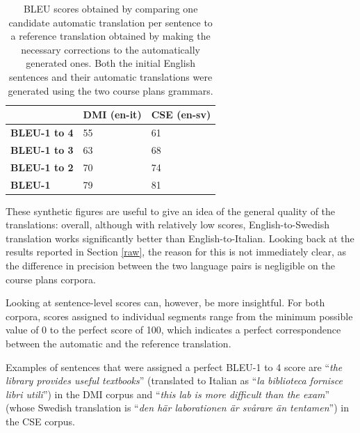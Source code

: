 \documentclass[11pt]{article}
\begin{document}
\begin{table}[h]
  \centering
  \begin{tabular}{l|ll}
  \textbf{}            & \textbf{DMI (en-it)} & \textbf{CSE (en-sv)} \\ \hline
  \textbf{BLEU-1 to 4} & 55         & 61         \\ 
  \textbf{BLEU-1 to 3} & 63         & 68         \\ 
  \textbf{BLEU-1 to 2} & 70         & 74          \\
  \textbf{BLEU-1}      & 79         & 81         \\ 
  \end{tabular}
  \caption[BLEU scores for automatic translations based on the course plans grammars]{BLEU scores obtained by comparing one candidate automatic translation per sentence to a reference translation obtained by making the necessary corrections to the automatically generated ones. Both the initial English sentences and their automatic translations were generated using the two course plans grammars.}
  \label{tableu}
\end{table}

These synthetic figures are useful to give an idea of the general quality of the translations: overall, although with relatively low scores, English-to-Swedish translation works significantly better than English-to-Italian. 
Looking back at the results reported in Section \ref{raw}, the reason for this is not immediately clear, as the difference in precision between the two language pairs is negligible on the course plans corpora.

Looking at sentence-level scores can, however, be more insightful. 
For both corpora, scores assigned to individual segments range from the minimum possible value of 0 to the perfect score of 100, which indicates a perfect correspondence between the automatic and the reference translation.

Examples of sentences that were assigned a perfect BLEU-1 to 4 score are ``\textit{the library provides useful textbooks}'' (translated to Italian as ``\textit{la biblioteca fornisce libri utili}'') in the DMI corpus and ``\textit{this lab is more difficult than the exam}'' (whose Swedish translation is ``\textit{den här laborationen är svårare än tentamen}'') in the CSE corpus. \smallskip
\end{document}
